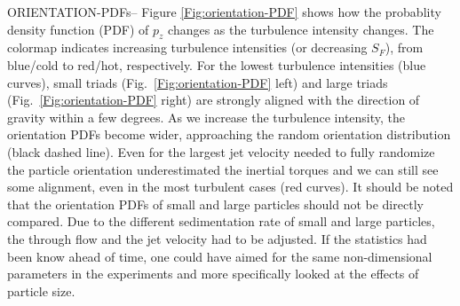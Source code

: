 \documentclass[]{jfm}
\begin{document}
ORIENTATION-PDFs-- Figure \ref{Fig:orientation-PDF} shows how the probablity density function (PDF) of $p_z$ changes as the turbulence intensity changes.  The colormap indicates increasing turbulence intensities (or decreasing $S_F$), from blue/cold to red/hot, respectively.  For the lowest turbulence intensities (blue curves), small triads (Fig.~\ref{Fig:orientation-PDF} left) and large triads (Fig.~\ref{Fig:orientation-PDF} right) are strongly aligned with the direction of gravity within a few degrees.  As we increase the turbulence intensity, the orientation PDFs become wider, approaching the random orientation distribution (black dashed line).  Even for the largest jet velocity needed to fully randomize the particle orientation underestimated the inertial torques and we can still see some alignment, even in the most turbulent cases (red curves).  It should be noted that the orientation PDFs of small and large particles should not be directly compared.  Due to the different sedimentation rate of small and large particles, the through flow and the jet velocity had to be adjusted.  If the statistics had been know ahead of time, one could have aimed for the same non-dimensional parameters in the experiments and more specifically looked at the effects of particle size.  
\end{document}
